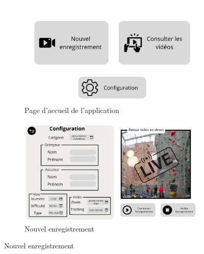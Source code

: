 \documentclass[a4paper, 11pt, french]{article}
\begin{document}
\begin{figure}[!ht]
  \centering
  \begin{subfigure}[c]{.48\textwidth}
    \includegraphics[width=\textwidth]{Ecran accueil appli.png}
    \caption{Page d'accueil de l'application}
  \end{subfigure}
  \begin{subfigure}[c]{.48\textwidth}
    \includegraphics[width=\textwidth]{Nouvel enrgistrement.png}
    \caption{Nouvel enregistrement}
    \label{fig:nvEnreg}
  \end{subfigure}


\end{figure}
\end{document}
